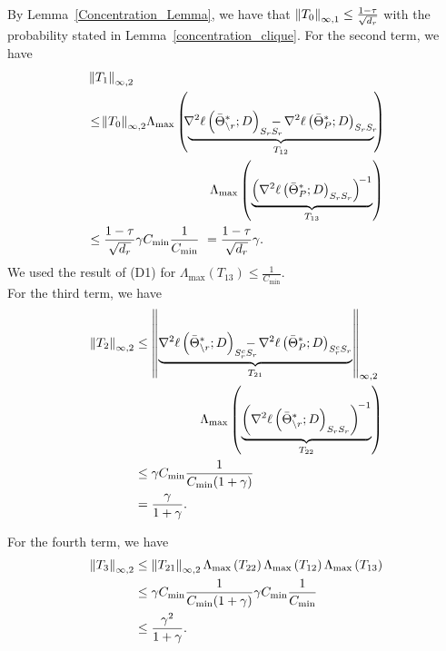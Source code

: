 By Lemma~\ref{Concentration_Lemma}, we have that $\left\|T_0\right\|_{\infty,1}\leq \frac{1-\tau}{\sqrt{d_{r}}}$ with the probability stated in Lemma~\ref{concentration_clique}. For the second term, we have
\begin{equation}
\begin{aligned}
&\norm{T_1}{\infty,2}\\ &\leq\!\norm{T_0}{\infty,2}\! \Lambda_{\max}\left(\underbrace{\!\!\nabla^2\ell\left(\bar{\Theta}^*_{\backslash\svert};D\right)_{\support_\svert\support_\svert} \!\!\!\!\!\!\!-\nabla^2\ell\left(\bar{\Theta}^*_P;D\right)_{\support_\svert\support_\svert}\!\!}_{T_{12}}\right)\\ &\qquad\qquad\qquad\qquad\qquad\!\!\Lambda_{\max}\left(\underbrace{\left(\nabla^2\ell\left(\bar{\Theta}^*_P;D\right)_{\support_\svert\support_\svert}\right)^{\!-1}}_{T_{13}}\right)\\
&\leq\frac{1-\tau}{\sqrt{d_\svert}}\gamma C_{\min}\frac{1}{C_{\min}}\,\,=\frac{1-\tau}{\sqrt{d_\svert}}\gamma.
\end{aligned}
\nonumber
\end{equation}
We used the result of (D1) for $\Lambda_{\max}\left(T_{13}\right)\leq\frac{1}{C_{\min}}$.\\

\noindent For the third term, we have
\begin{equation}
\begin{aligned}
\norm{T_2}{\infty,2} &\leq \norm{\underbrace{\nabla^2\ell\left(\bar{\Theta}^*_{\backslash\svert};D\right)_{\support_\svert^c\support_\svert} \!\!\!\!\!\!\!-\nabla^2\ell\left(\bar{\Theta}^*_P;D\right)_{\support_\svert^c\support_\svert}}_{T_{21}}}{\infty,2}\\ &\qquad\qquad\quad\,\Lambda_{\max}\left(\underbrace{\left(\nabla^2\ell\left(\bar{\Theta}^*_{\backslash\svert};D\right)_{\support_\svert\support_\svert}\right)^{\!-1}}_{T_{22}}\right)\\
&\leq\gamma C_{\min}\frac{1}{C_{\min}(1+\gamma)}\\
&=\frac{\gamma}{1+\gamma}.
\end{aligned}
\nonumber
\end{equation}

\noindent For the fourth term, we have
\begin{equation}
\begin{aligned}
\left\|T_3\right\|_{\infty,2}&\leq \left\|T_{21}\right\|_{\infty,2} \Lambda_{\max}\left(T_{22}\right)\Lambda_{\max}\left(T_{12}\right) 
\Lambda_{\max}\left(T_{13}\right)\\
&\leq\gamma C_{\min}\frac{1}{C_{\min}(1+\gamma)}\gamma C_{\min} \frac{1}{C_{\min}}\\
&\leq\frac{\gamma^2}{1+\gamma}.\\
\end{aligned}
\nonumber
\end{equation}

